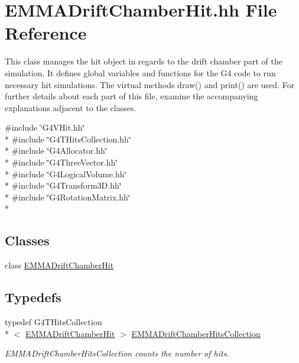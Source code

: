 \hypertarget{EMMADriftChamberHit_8hh}{\section{E\-M\-M\-A\-Drift\-Chamber\-Hit.\-hh File Reference}
\label{EMMADriftChamberHit_8hh}
}


This class manages the hit object in regards to the drift chamber part of the simulation. It defines global variables and functions for the G4 code to run necessary hit simulations. The virtual methods draw() and print() are used. For further details about each part of this file, examine the accompanying explanations adjacent to the classes.  


{\ttfamily \#include \char`\"{}G4\-V\-Hit.\-hh\char`\"{}}\\*
{\ttfamily \#include \char`\"{}G4\-T\-Hits\-Collection.\-hh\char`\"{}}\\*
{\ttfamily \#include \char`\"{}G4\-Allocator.\-hh\char`\"{}}\\*
{\ttfamily \#include \char`\"{}G4\-Three\-Vector.\-hh\char`\"{}}\\*
{\ttfamily \#include \char`\"{}G4\-Logical\-Volume.\-hh\char`\"{}}\\*
{\ttfamily \#include \char`\"{}G4\-Transform3\-D.\-hh\char`\"{}}\\*
{\ttfamily \#include \char`\"{}G4\-Rotation\-Matrix.\-hh\char`\"{}}\\*
\subsection*{Classes}
\begin{DoxyCompactItemize}
\item 
class \hyperlink{classEMMADriftChamberHit}{E\-M\-M\-A\-Drift\-Chamber\-Hit}
\end{DoxyCompactItemize}
\subsection*{Typedefs}
\begin{DoxyCompactItemize}
\item 
\hypertarget{EMMADriftChamberHit_8hh_a22ef55da69b903e8da573af3049cf972}{typedef G4\-T\-Hits\-Collection\\*
$<$ \hyperlink{classEMMADriftChamberHit}{E\-M\-M\-A\-Drift\-Chamber\-Hit} $>$ \hyperlink{EMMADriftChamberHit_8hh_a22ef55da69b903e8da573af3049cf972}{E\-M\-M\-A\-Drift\-Chamber\-Hits\-Collection}}\label{EMMADriftChamberHit_8hh_a22ef55da69b903e8da573af3049cf972}

\begin{DoxyCompactList}\small\item\em E\-M\-M\-A\-Drift\-Chamber\-Hits\-Collection counts the number of hits. \end{DoxyCompactList}\end{DoxyCompactItemize}
